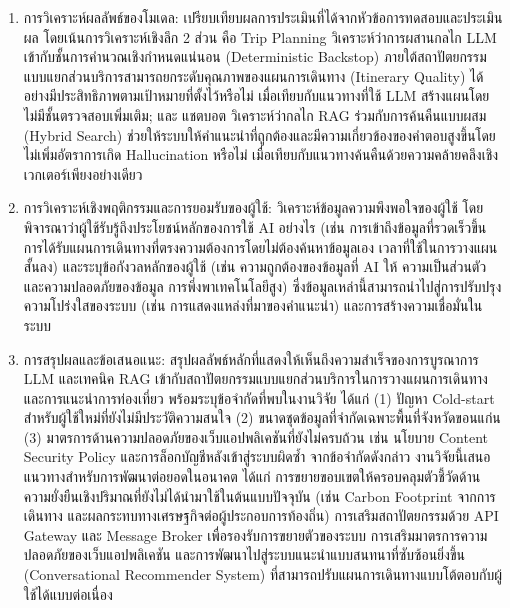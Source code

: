 \begin{enumerate}[label=(\arabic*),leftmargin=0pt,itemindent=\dimexpr\parindent+\parenlabelwidth+1em\relax,align=right,labelwidth=\parenlabelwidth,labelsep=1em]
\item การวิเคราะห์ผลลัพธ์ของโมเดล: เปรียบเทียบผลการประเมินที่ได้จากหัวข้อการทดสอบและประเมินผล โดยเน้นการวิเคราะห์เชิงลึก 2 ส่วน คือ Trip Planning วิเคราะห์ว่าการผสานกลไก LLM เข้ากับชั้นการคำนวณเชิงกำหนดแน่นอน (Deterministic Backstop) ภายใต้สถาปัตยกรรมแบบแยกส่วนบริการสามารถยกระดับคุณภาพของแผนการเดินทาง (Itinerary Quality) ได้อย่างมีประสิทธิภาพตามเป้าหมายที่ตั้งไว้หรือไม่ เมื่อเทียบกับแนวทางที่ใช้ LLM สร้างแผนโดยไม่มีชั้นตรวจสอบเพิ่มเติม; และ แชตบอต วิเคราะห์ว่ากลไก RAG ร่วมกับการค้นคืนแบบผสม (Hybrid Search) ช่วยให้ระบบให้คำแนะนำที่ถูกต้องและมีความเกี่ยวข้องของคำตอบสูงขึ้นโดยไม่เพิ่มอัตราการเกิด Hallucination หรือไม่ เมื่อเทียบกับแนวทางค้นคืนด้วยความคล้ายคลึงเชิงเวกเตอร์เพียงอย่างเดียว

\item การวิเคราะห์เชิงพฤติกรรมและการยอมรับของผู้ใช้: วิเคราะห์ข้อมูลความพึงพอใจของผู้ใช้ โดยพิจารณาว่าผู้ใช้รับรู้ถึงประโยชน์หลักของการใช้ AI อย่างไร (เช่น การเข้าถึงข้อมูลที่รวดเร็วขึ้น การได้รับแผนการเดินทางที่ตรงความต้องการโดยไม่ต้องค้นหาข้อมูลเอง เวลาที่ใช้ในการวางแผนสั้นลง) และระบุข้อกังวลหลักของผู้ใช้ (เช่น ความถูกต้องของข้อมูลที่ AI ให้ ความเป็นส่วนตัวและความปลอดภัยของข้อมูล การพึ่งพาเทคโนโลยีสูง) ซึ่งข้อมูลเหล่านี้สามารถนำไปสู่การปรับปรุงความโปร่งใสของระบบ (เช่น การแสดงแหล่งที่มาของคำแนะนำ) และการสร้างความเชื่อมั่นในระบบ

\item การสรุปผลและข้อเสนอแนะ: สรุปผลลัพธ์หลักที่แสดงให้เห็นถึงความสำเร็จของการบูรณาการ LLM และเทคนิค RAG เข้ากับสถาปัตยกรรมแบบแยกส่วนบริการในการวางแผนการเดินทางและการแนะนำการท่องเที่ยว พร้อมระบุข้อจำกัดที่พบในงานวิจัย ได้แก่ (1) ปัญหา Cold-start สำหรับผู้ใช้ใหม่ที่ยังไม่มีประวัติความสนใจ (2) ขนาดชุดข้อมูลที่จำกัดเฉพาะพื้นที่จังหวัดขอนแก่น (3) มาตรการด้านความปลอดภัยของเว็บแอปพลิเคชันที่ยังไม่ครบถ้วน เช่น นโยบาย Content Security Policy และการล็อกบัญชีหลังเข้าสู่ระบบผิดซ้ำ จากข้อจำกัดดังกล่าว งานวิจัยนี้เสนอแนวทางสำหรับการพัฒนาต่อยอดในอนาคต ได้แก่ การขยายขอบเขตให้ครอบคลุมตัวชี้วัดด้านความยั่งยืนเชิงปริมาณที่ยังไม่ได้นำมาใช้ในต้นแบบปัจจุบัน (เช่น Carbon Footprint จากการเดินทาง และผลกระทบทางเศรษฐกิจต่อผู้ประกอบการท้องถิ่น) การเสริมสถาปัตยกรรมด้วย API Gateway และ Message Broker เพื่อรองรับการขยายตัวของระบบ การเสริมมาตรการความปลอดภัยของเว็บแอปพลิเคชัน และการพัฒนาไปสู่ระบบแนะนำแบบสนทนาที่ซับซ้อนยิ่งขึ้น (Conversational Recommender System) ที่สามารถปรับแผนการเดินทางแบบโต้ตอบกับผู้ใช้ได้แบบต่อเนื่อง
\end{enumerate}

